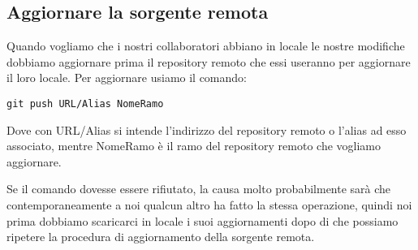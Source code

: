\subsection{Aggiornare la sorgente remota}
Quando vogliamo che i nostri collaboratori abbiano in locale le nostre modifiche dobbiamo aggiornare prima il repository remoto che essi useranno per aggiornare il loro locale. Per aggiornare usiamo il comando:

\begin{center}
\texttt{git push URL/Alias NomeRamo}
\end{center}

Dove con URL/Alias si intende l'indirizzo del repository remoto o l'alias ad esso associato, mentre NomeRamo è il ramo del repository remoto che vogliamo aggiornare.

Se il comando dovesse essere rifiutato, la causa molto probabilmente sarà che contemporaneamente a noi qualcun altro ha fatto la stessa operazione, quindi noi prima dobbiamo scaricarci in locale i suoi aggiornamenti dopo di che possiamo ripetere la procedura di aggiornamento della sorgente remota.